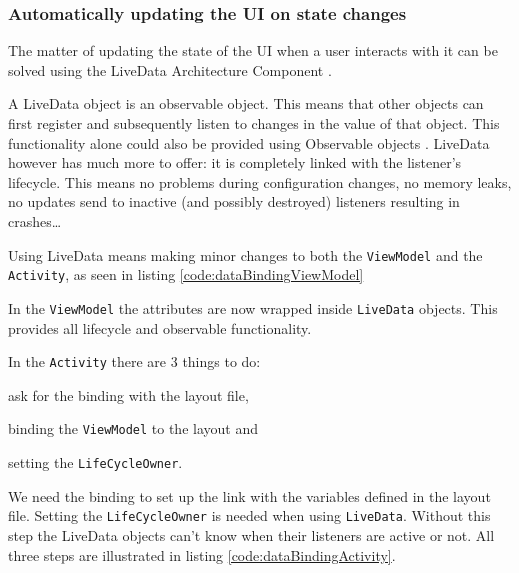 

\subsubsection{Automatically updating the UI on state changes}
The matter of updating the state of the UI when a user interacts with it can be solved using the LiveData Architecture Component \cite{liveData}.

A LiveData object is an observable object. This means that other objects can first register and subsequently listen to changes in the value of that object.
This functionality alone could also be provided using Observable objects \cite{observable}.
LiveData however has much more to offer: it is completely linked with the listener's lifecycle. This means no problems during configuration changes, no memory leaks, no updates send to inactive (and possibly destroyed) listeners resulting in crashes\ldots

Using LiveData means making minor changes to both the \lstinline!ViewModel! and the \lstinline!Activity!, as seen in listing \ref{code:dataBindingViewModel}

In the \lstinline!ViewModel! the attributes are now wrapped inside \lstinline!LiveData! objects.
This provides all lifecycle and observable functionality. 



In the \lstinline!Activity! there are 3 things to do:
\begin{inparaenum}[(i)]
	\item ask for the binding with the layout file,
	\item binding the \lstinline!ViewModel! to the layout and
	\item setting the \lstinline!LifeCycleOwner!.
\end{inparaenum}

We need the binding to set up the link with the variables defined in the layout file. 
Setting the \lstinline!LifeCycleOwner! is needed when using \lstinline!LiveData!. 
Without this step the LiveData objects can't know when their listeners are active or not. All three steps are illustrated in listing \ref{code:dataBindingActivity}.


